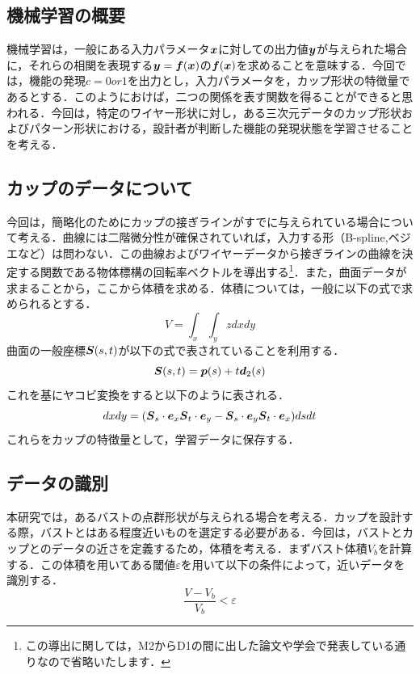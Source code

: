 \documentclass[11pt]{jsarticle}
\begin{document}
		\subsection{機械学習の概要}
			機械学習は，一般にある入力パラメータ$ \boldsymbol{x} $に対しての出力値$ \boldsymbol{y} $が与えられた場合に，それらの相関を表現する$ \boldsymbol{y} = \boldsymbol{f} (\boldsymbol{x}) $の$ \boldsymbol{f} (\boldsymbol{x})  $を求めることを意味する．今回では，機能の発現$c = 0 or 1 $を出力とし，入力パラメータを，カップ形状の特徴量であるとする．このようにおけば，二つの関係を表す関数を得ることができると思われる．今回は，特定のワイヤー形状に対し，ある三次元データのカップ形状およびパターン形状における，設計者が判断した機能の発現状態を学習させることを考える．
		\subsection{カップのデータについて}
			今回は，簡略化のためにカップの接ぎラインがすでに与えられている場合について考える．曲線には二階微分性が確保されていれば，入力する形（B-spline,ベジエなど）は問わない．この曲線およびワイヤーデータから接ぎラインの曲線を決定する関数である物体標構の回転率ベクトルを導出する\footnote{この導出に関しては，M2からD1の間に出した論文や学会で発表している通りなので省略いたします．}．また，曲面データが求まることから，ここから体積を求める．体積については，一般に以下の式で求められるとする．
			\begin{equation}\label{eq:VolGeneralEq}
				V = \int_x \int_y z dxdy
			\end{equation}
			曲面の一般座標$ \boldsymbol{S}(s,t) $が以下の式で表されていることを利用する．
			\begin{equation}\label{eq:GeneralSurfaceEq}
				\boldsymbol{S}(s,t) = \boldsymbol{p}(s) + t \boldsymbol{d}_2(s)
			\end{equation}
			これを基にヤコビ変換をすると以下のように表される．
			\begin{equation}\label{eq:JacobiEq}
				dxdy = (\boldsymbol{S}_s \cdot \boldsymbol{e}_x \boldsymbol{S}_t \cdot \boldsymbol{e}_y - \boldsymbol{S}_s \cdot \boldsymbol{e}_y \boldsymbol{S}_t \cdot \boldsymbol{e}_x)dsdt 
			\end{equation}
			これらをカップの特徴量として，学習データに保存する．
		\subsection{データの識別}
			本研究では，あるバストの点群形状が与えられる場合を考える．カップを設計する際，バストとはある程度近いものを選定する必要がある．今回は，バストとカップとのデータの近さを定義するため，体積を考える．まずバスト体積$ V_b $を計算する．この体積を用いてある閾値$ \varepsilon $を用いて以下の条件によって，近いデータを識別する．
			\begin{equation}\label{eq:Divide}
				\frac{V-V_b}{V_b}<\varepsilon
			\end{equation}
\end{document}
